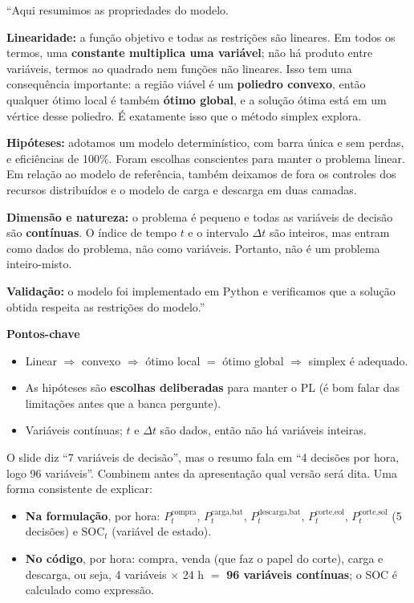 \documentclass[11pt,a4paper]{article}
\begin{document}
\begin{fala}
``Aqui resumimos as propriedades do modelo.

\textbf{Linearidade:} a função objetivo e todas as restrições são lineares. Em todos os termos, uma
\textbf{constante multiplica uma variável}; não há produto entre variáveis, termos ao quadrado nem funções não
lineares. Isso tem uma consequência importante: a região viável é um \textbf{poliedro convexo}, então
qualquer ótimo local é também \textbf{ótimo global}, e a solução ótima está em um vértice desse poliedro.
É exatamente isso que o método simplex explora.

\textbf{Hipóteses:} adotamos um modelo determinístico, com barra única e sem perdas, e eficiências de 100\%.
Foram escolhas conscientes para manter o problema linear. Em relação ao modelo de referência, também deixamos
de fora os controles dos recursos distribuídos e o modelo de carga e descarga em duas camadas.

\textbf{Dimensão e natureza:} o problema é pequeno e todas as variáveis de decisão são \textbf{contínuas}.
O índice de tempo $t$ e o intervalo $\Delta t$ são inteiros, mas entram como dados do problema, não como
variáveis. Portanto, não é um problema inteiro-misto.

\textbf{Validação:} o modelo foi implementado em Python e verificamos que a solução obtida respeita as restrições
do modelo.''
\end{fala}

\noindent\textbf{Pontos-chave}
\begin{itemize}
  \item Linear $\Rightarrow$ convexo $\Rightarrow$ ótimo local $=$ ótimo global $\Rightarrow$ simplex é adequado.
  \item As hipóteses são \textbf{escolhas deliberadas} para manter o PL (é bom falar das limitações antes que a banca pergunte).
  \item Variáveis contínuas; $t$ e $\Delta t$ são dados, então não há variáveis inteiras.
\end{itemize}

\begin{alerta}
O slide diz ``7 variáveis de decisão'', mas o resumo fala em ``4 decisões por hora, logo 96 variáveis''. Combinem
antes da apresentação qual versão será dita. Uma forma consistente de explicar:
\begin{itemize}[leftmargin=12pt]
  \item \textbf{Na formulação}, por hora: $P^{\text{compra}}_t$, $P^{\text{carga,bat}}_t$, $P^{\text{descarga,bat}}_t$,
        $P^{\text{corte,eol}}_t$, $P^{\text{corte,sol}}_t$ (5 decisões) e $\mathrm{SOC}_t$ (variável de estado).
  \item \textbf{No código}, por hora: compra, venda (que faz o papel do corte), carga e descarga, ou seja,
        4 variáveis $\times$ 24 h $=$ \textbf{96 variáveis contínuas}; o SOC é calculado como expressão.
\end{itemize}
\end{alerta}
\end{document}
